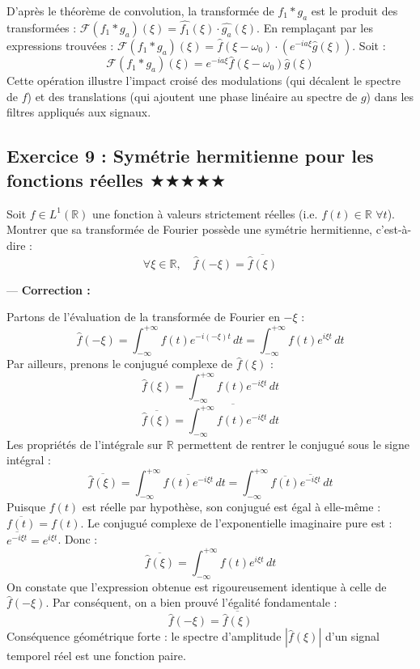 \documentclass[11pt,a4paper]{article}
\begin{document}
D'après le théorème de convolution, la transformée de $f_1 * g_a$ est le produit des transformées :
$\mathcal{F}(f_1 * g_a)(\xi) = \widehat{f_1}(\xi) \cdot \widehat{g_a}(\xi)$.
En remplaçant par les expressions trouvées :
$\mathcal{F}(f_1 * g_a)(\xi) = \hat{f}(\xi - \omega_0) \cdot \left( e^{-ia\xi} \hat{g}(\xi) \right)$.
Soit :
$$ \mathcal{F}(f_1 * g_a)(\xi) = e^{-ia\xi} \hat{f}(\xi - \omega_0) \hat{g}(\xi) $$
Cette opération illustre l'impact croisé des modulations (qui décalent le spectre de $f$) et des translations (qui ajoutent une phase linéaire au spectre de $g$) dans les filtres appliqués aux signaux.


\subsection*{Exercice 9 : Symétrie hermitienne pour les fonctions réelles \quad $\bigstar\bigstar\bigstar\bigstar\bigstar$}

Soit $f \in L^1(\mathbb{R})$ une fonction à valeurs strictement réelles (i.e. $f(t) \in \mathbb{R}$ $\forall t$).
Montrer que sa transformée de Fourier possède une symétrie hermitienne, c'est-à-dire :
$$ \forall \xi \in \mathbb{R}, \quad \hat{f}(-\xi) = \overline{\hat{f}(\xi)} $$

---
\textbf{Correction :}

Partons de l'évaluation de la transformée de Fourier en $-\xi$ :
$$ \hat{f}(-\xi) = \int_{-\infty}^{+\infty} f(t) e^{-i(-\xi) t} \, dt = \int_{-\infty}^{+\infty} f(t) e^{i\xi t} \, dt $$
Par ailleurs, prenons le conjugué complexe de $\hat{f}(\xi)$ :
$$ \hat{f}(\xi) = \int_{-\infty}^{+\infty} f(t) e^{-i\xi t} \, dt $$
$$ \overline{\hat{f}(\xi)} = \overline{\int_{-\infty}^{+\infty} f(t) e^{-i\xi t} \, dt} $$
Les propriétés de l'intégrale sur $\mathbb{R}$ permettent de rentrer le conjugué sous le signe intégral :
$$ \overline{\hat{f}(\xi)} = \int_{-\infty}^{+\infty} \overline{f(t) e^{-i\xi t}} \, dt = \int_{-\infty}^{+\infty} \overline{f(t)} \overline{e^{-i\xi t}} \, dt $$
Puisque $f(t)$ est réelle par hypothèse, son conjugué est égal à elle-même : $\overline{f(t)} = f(t)$.
Le conjugué complexe de l'exponentielle imaginaire pure est : $\overline{e^{-i\xi t}} = e^{i\xi t}$.
Donc :
$$ \overline{\hat{f}(\xi)} = \int_{-\infty}^{+\infty} f(t) e^{i\xi t} \, dt $$
On constate que l'expression obtenue est rigoureusement identique à celle de $\hat{f}(-\xi)$.
Par conséquent, on a bien prouvé l'égalité fondamentale :
$$ \hat{f}(-\xi) = \overline{\hat{f}(\xi)} $$
Conséquence géométrique forte : le spectre d'amplitude $|\hat{f}(\xi)|$ d'un signal temporel réel est une fonction paire.
\end{document}
